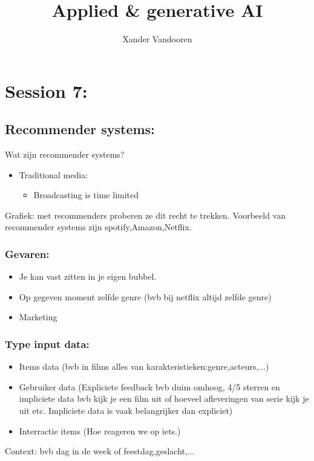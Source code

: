\documentclass[12pt]{article}
\begin{document}
\begin{titlepage}
    \author{Xander Vandooren}
    \title{Applied \& generative AI}
\end{titlepage}
\maketitle
\newpage
\tableofcontents
\newpage
{}
\section{Session 7:}
\subsection{Recommender systems:}
Wat zijn recommender systems?
\begin{itemize}
    \item Traditional media:\begin{itemize}
        \item Broadcasting is time limited
    \end{itemize}
\end{itemize}
Grafiek: met recommenders proberen ze dit recht te trekken.
Voorbeeld van recommender systems zijn spotify,Amazon,Netflix.
\subsubsection{Gevaren:}
\begin{itemize}
    \item Je kan vast zitten in je eigen bubbel.
    \item Op gegeven moment zelfde genre (bvb bij netflix altijd zelfde genre)
    \item Marketing 
\end{itemize}
\subsubsection{Type input data:}
\begin{itemize}
    \item Items data (bvb in films alles van karakteristieken:genre,acteurs,...)
    \item Gebruiker data (Expliciete feedback bvb duim omhoog, 4/5 sterren en impliciete data bvb kijk je een film uit of hoeveel afleveringen van serie kijk je uit etc. Impliciete data is vaak belangrijker dan expliciet)
    \item Interractie items (Hoe reageren we op iets.)
\end{itemize}
Context: bvb dag in de week of feestdag,geslacht,... 
\end{document}
